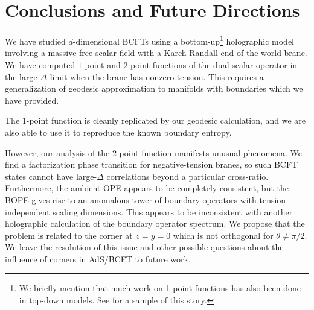 \documentclass[reprint,amsmath,amssymb,aps,nofootinbib,twocolumn]{revtex4-2}
\newcommand{\jani}[1]{\textcolor{blue}{\textbf{??JK:} #1}}
\begin{document}







\section{Conclusions and Future Directions}

We have studied $ d $-dimensional BCFTs using a bottom-up\footnote{We briefly mention that much work on 1-point functions has also been done in top-down models. See \cite{Nagasaki:2012re,Kristjansen:2012tn,Buhl-Mortensen:2015gfd} for a sample of this story.} holographic model involving a massive free scalar field with a Karch-Randall end-of-the-world brane. We have computed $1$-point and $2$-point functions of the dual scalar operator in the large-$ \Delta $ limit when the brane has nonzero tension. This requires a generalization of geodesic approximation to manifolds with boundaries which we have provided.

The $1$-point function is cleanly replicated by our geodesic calculation, and we are also able to use it to reproduce the known boundary entropy.

However, our analysis of the $2$-point function manifests unusual phenomena. We find a factorization phase transition for negative-tension branes, so such BCFT states cannot have large-$\Delta$ correlations beyond a particular cross-ratio. Furthermore, the ambient OPE appears to be completely consistent, but the BOPE gives rise to an anomalous tower of boundary operators with tension-independent scaling dimensions. This appears to be inconsistent with another holographic calculation of the boundary operator spectrum. We propose that the problem is related to the corner at $ z=y=0 $ which is not orthogonal for $ \theta \neq \pi \slash 2 $. We leave the resolution of this issue and other possible questions about the influence of corners in AdS/BCFT to future work.
\end{document}
